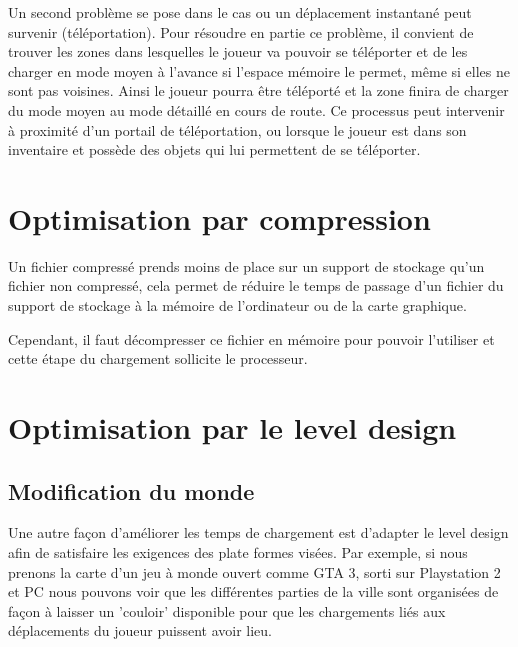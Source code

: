 \documentclass[a4paper, 11pt]{article} %
\begin{document}
Un second problème se pose dans le cas ou un déplacement instantané peut survenir (téléportation). Pour résoudre en partie ce problème, il convient de trouver les zones dans lesquelles le joueur va pouvoir se téléporter et de les charger en mode moyen à l'avance si l'espace mémoire le permet, même si elles ne sont pas voisines. Ainsi le joueur pourra être téléporté et la zone finira de charger du mode moyen au mode détaillé en cours de route. Ce processus peut intervenir à proximité d'un portail de téléportation, ou lorsque le joueur est dans son inventaire et possède des objets qui lui permettent de se téléporter.

\newpage
\section*{Optimisation par compression}
Un fichier compressé prends moins de place sur un support de stockage qu'un fichier non compressé, cela permet de réduire le temps de passage d'un fichier du support de stockage à la mémoire de l'ordinateur ou de la carte graphique.

Cependant, il faut décompresser ce fichier en mémoire pour pouvoir l'utiliser et cette étape du chargement sollicite le processeur.


\newpage
\section*{Optimisation par le level design}
\subsection*{Modification du monde}
Une autre façon d'améliorer les temps de chargement est d'adapter le level design afin de satisfaire les exigences des plate formes visées. Par exemple, si nous prenons la carte d'un jeu à monde ouvert comme GTA 3, sorti sur Playstation 2 et PC nous pouvons voir que les différentes parties de la ville sont organisées de façon à laisser un 'couloir' disponible pour que les chargements liés aux déplacements du joueur puissent avoir lieu.
\end{document}

